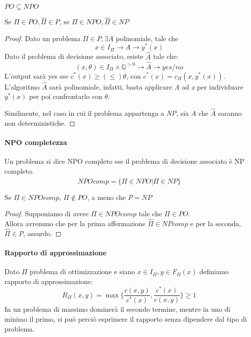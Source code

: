 \begin{theorem}
    $PO \subseteq NPO$
\end{theorem}
\begin{theorem}
    Se $\Pi \in \mathit{PO}, \hat{\Pi} \in P$, 
    se $\Pi \in \mathit{NPO}, \hat{\Pi} \in \mathit{NP}$ 
\end{theorem}
\begin{proof}
    Dato un problema $\Pi \in P, \exists A$ polinomiale, tale che
    $$x \in I_\Pi \longrightarrow A \longrightarrow y^*(x)$$
    Dato il problema di decisione associato, esiste $\hat{A}$ tale che:
    $$(x, \theta) \in I_\Pi \times \mathbb{Q}^{>0} \longrightarrow \hat{A} \longrightarrow yes/no$$
    L'output sarà yes sse $c^*(x) \geq (\leq) \theta$, con $c^*(x) = c_\Pi(x, y^*(x))$.\\
    
    L'algoritmo $\hat{A}$ sarà polinomiale, infatti, basta applicare \emph{A} ad \emph{x} 
    per individuare $y^*(x)$ per poi confrontarlo con $\theta$. 

    Similmente, nel caso in cui il problema appartenga a \emph{NP}, sia $A$ che $\hat{A}$ saranno non
    deterministiche.
\end{proof}

\paragraph{NPO completezza}
Un problema si dice NPO completo sse il problema di decisione associato è NP completo.\\
$$\mathit{NPOcomp} = \{\Pi \in \mathit{NPO} | \hat{\Pi} \in \mathit{NP}\}$$

\begin{theorem}
    Se $\Pi \in \mathit{NPOcomp}$, $\Pi \notin PO$, a meno che $P=NP$
\end{theorem}
\begin{proof}
    Supponiamo di avere $\Pi \in \mathit{NPOcomp}$ tale che $\Pi \in PO$.\\
    Allora avremmo che per la prima affermazione $\hat{\Pi} \in \mathit{NPcomp}$ e per la seconda, 
    $\hat{\Pi} \in P$, assurdo.
\end{proof}

\paragraph{Rapporto di approssimazione}
Dato $\Pi$ problema di ottimizzazione e siano $x \in I_\Pi, y \in F_\Pi(x)$ definiamo
rapporto di approssimazione:
$$R_\Pi(x, y) = \max\bigg\{\frac{c(x, y)}{c^*(x)}, \frac{c^*(x)}{c(x, y)}\bigg\}\geq 1$$
In un problema di massimo dominerà il secondo termine, mentre in uno di minimo il primo, 
si può perciò esprimere il rapporto senza dipendere dal tipo di problema.


